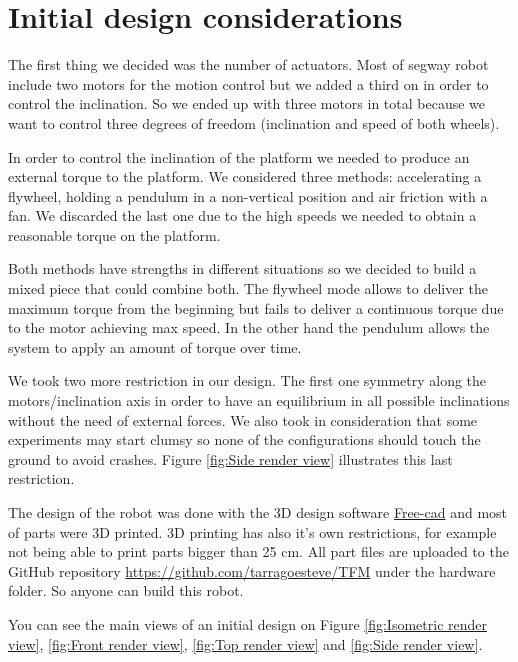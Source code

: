 \section{Initial design considerations}
The first thing we decided was the number of actuators.
Most of segway robot include two motors for the motion control but
we added a third on in order to control the inclination.
So we ended up with three motors in total because we want to control
three degrees of freedom (inclination and speed of both wheels).

In order to control the inclination of the platform we needed to produce
an external torque to the platform. We considered three methods: accelerating
a flywheel, holding a pendulum in a non-vertical position and air friction
with a fan. We discarded the last one due to the high speeds we needed to obtain
a reasonable torque on the platform.

Both methods have strengths in different situations so we decided to build a mixed
piece that could combine both. The flywheel mode allows to deliver the maximum torque from
the beginning but fails to deliver a continuous torque due to the motor achieving max speed.
In the other hand the pendulum allows the system to apply an amount of torque over time.

We took two more restriction in our design. The first one symmetry along the motors/inclination
axis in order to have an equilibrium in all possible inclinations without the need of external forces.
We also took in consideration that some experiments may start clumsy so none of the configurations should
touch the ground to avoid crashes. Figure \ref{fig:Side render view} illustrates this last restriction.

The design of the robot was done with the 3D design software \href{https://www.freecadweb.org/}{Free-cad} and 
most of parts were 3D printed. 3D printing has also it's own restrictions, for example not being able to print
parts bigger than 25 cm. All part files are uploaded to the GitHub repository \url{https://github.com/tarragoesteve/TFM}
under the hardware folder. So anyone can build this robot.

You can see the main views of an initial design on Figure \ref{fig:Isometric render view},
\ref{fig:Front render view}, \ref{fig:Top render view} and \ref{fig:Side render view}.

